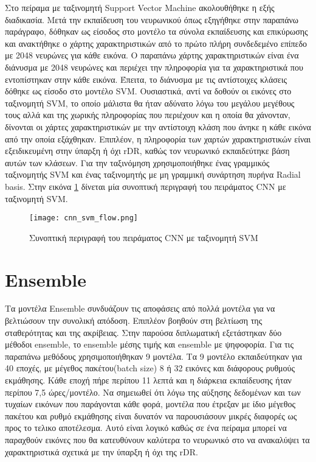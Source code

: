 Στο πείραμα με ταξινομητή Support Vector Machine ακολουθήθηκε η εξής διαδικασία. Μετά την εκπαίδευση  του νευρωνικού όπως εξηγήθηκε στην παραπάνω παράγραφο, δόθηκαν ως είσοδος στο μοντέλο τα σύνολα εκπαίδευσης και επικύρωσης και ανακτήθηκε ο χάρτης χαρακτηριστικών από το πρώτο πλήρη συνδεδεμένο επίπεδο με 2048 νευρώνες για κάθε εικόνα. Ο παραπάνω χάρτης χαρακτηριστικών είναι ένα διάνυσμα με 2048 νευρώνες και περιέχει την πληροφορία για τα χαρακτηριστικά που εντοπίστηκαν στην κάθε εικόνα. Έπειτα, το διάνυσμα με τις αντίστοιχες κλάσεις δόθηκε ως είσοδο στο μοντέλο SVM.
  Ουσιαστικά, αντί να δοθούν οι εικόνες στο ταξινομητή SVM, το οποίο μάλιστα θα ήταν αδύνατο λόγω του μεγάλου μεγέθους τους αλλά και της χωρικής πληροφορίας που περιέχουν και η οποία θα χάνονταν, δίνονται οι χάρτες χαρακτηριστικών με την αντίστοιχη κλάση που άνηκε η κάθε εικόνα από την οποία εξάχθηκαν. Επιπλέον, η πληροφορία των χαρτών χαρακτηριστικών είναι εξειδικευμένη στην ύπαρξη ή όχι rDR, καθώς τον νευρωνικό εκπαιδεύτηκε βάση αυτών των κλάσεων. Για την ταξινόμηση χρησιμοποιήθηκε ένας γραμμικός ταξινομητής SVM και ένας ταξινομητής με μη γραμμική συνάρτηση πυρήνα Radial basis. Στην εικόνα \ref{figure:cnnflowsvm} δίνεται μία συνοπτική περιγραφή του πειράματος CNN με ταξινομητή SVM.
  

  
\begin{figure}[!h]
    \centering
      \texttt{[image: cnn\_svm\_flow.png]} \caption{Συνοπτική περιγραφή του πειράματος CNN με ταξινομητή SVM}
\label{figure:cnnflowsvm}  
\end{figure}


\section{Ensemble}
\label{sec:5.3}

Τα μοντέλα Ensemble συνδυάζουν τις αποφάσεις από πολλά μοντέλα για να βελτιώσουν την συνολική απόδοση. Επιπλέον βοηθούν στη βελτίωση της σταθερότητας και της ακρίβειας. Στην παρούσα διπλωματική εξετάστηκαν δύο μέθοδοι ensemble, το ensemble μέσης τιμής και ensemble με ψηφοφορία.
Για τις παραπάνω μεθόδους χρησιμοποιήθηκαν 9 μοντέλα. Τα 9 μοντέλο εκπαιδεύτηκαν για 40 εποχές, με μέγεθος πακέτου(batch size) 8 ή 32 εικόνες και διάφορους ρυθμούς εκμάθησης. Κάθε εποχή πήρε περίπου 11 λεπτά και η διάρκεια εκπαίδευσης ήταν περίπου 7,5 ώρες/μοντέλο. Να σημειωθεί ότι λόγω της αύξησης δεδομένων και των τυχαίων εικόνων που παράγονται κάθε φορά, μοντέλα που έτρεξαν με ίδιο μέγεθος πακέτου και ρυθμό εκμάθησης είναι δυνατόν να  παρουσιάσουν μικρές διαφορές ως προς το τελικο αποτέλεσμα. Αυτό είναι λογικό καθώς σε ένα πείραμα μπορεί να παραχθούν  εικόνες που θα κατευθύνουν καλύτερα το νευρωνικό στο να ανακαλύψει τα χαρακτηριστικά σχετικά με την ύπαρξη ή όχι της rDR.   
 
